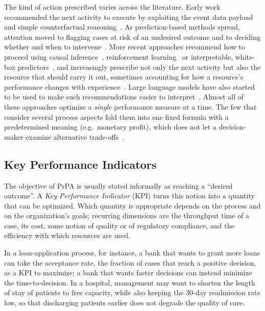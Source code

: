 The kind of action prescribed varies across the literature. Early work
recommended the next activity to execute by exploiting the event data payload
and simple counterfactual reasoning~\cite{groger2014}. As prediction-based
methods spread, attention moved to flagging cases at risk of an undesired
outcome and to deciding whether and when to
intervene~\cite{teinemaa2018,fahrenkrogpetersen2022}. More recent approaches
recommend how to proceed using causal inference~\cite{bozorgi2021prescriptive, bozorgi2023},
reinforcement learning~\cite{branchi2022,metzger2020,shoush2022} or
interpretable, white-box predictors~\cite{padella2022}, and increasingly
prescribe not only the next activity but also the resource that should carry
it out, sometimes accounting for how a resource's performance changes with
experience~\cite{padella2024}. Large language models have also started to be
used to make such recommendations easier to interpret~\cite{kubrak2024}.
Almost all of these approaches optimize a \emph{single} performance measure
at a time. The few that consider several process aspects fold them into one
fixed formula with a predetermined meaning (e.g.\ monetary profit), which
does not let a decision-maker examine alternative
trade-offs~\cite{le2025balancing}.

\subsection{Key Performance Indicators}
    \label{subsec:bg:prpa:kpi}
    The objective of PrPA is usually stated informally as reaching a
    ``desired outcome''. A \emph{Key Performance Indicator} (KPI) turns this
    notion into a quantity that can be optimized. Which quantity is
    appropriate depends on the process and on the organization's goals;
    recurring dimensions are the throughput time of a case, its cost, some
    notion of quality or of regulatory compliance, and the efficiency with
    which resources are used.

    In a loan-application process, for instance, a bank that wants to grant
    more loans can take the acceptance rate, the fraction of cases that reach
    a positive decision, as a KPI to maximize; a bank that wants faster
    decisions can instead minimize the time-to-decision. In a hospital, management may want to shorten
    the length of stay of patients to free capacity, while also
    keeping the 30-day readmission rate low, so that discharging patients
    earlier does not degrade the quality of care.

